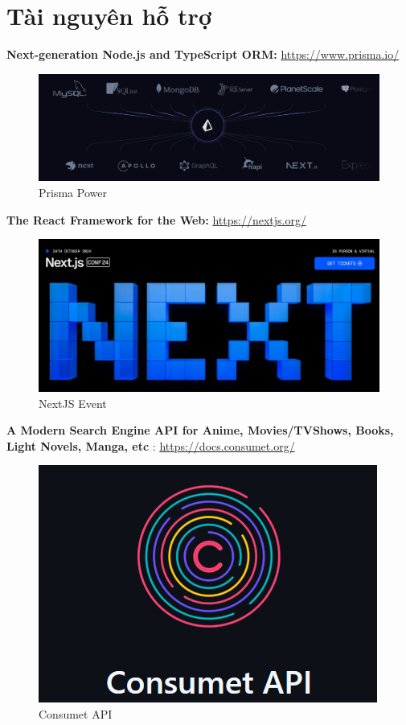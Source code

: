 \section{Tài nguyên hỗ trợ}

\textbf{Next-generation Node.js and TypeScript ORM:} \href{https://www.prisma.io/}{https://www.prisma.io/}

\begin{figure}[H]
    \centering
    \includegraphics[width=0.5\linewidth]{content/resource/image/prisma.png}
    \caption{Prisma Power}
    \label{fig:enter-label}
\end{figure}

\textbf{The React Framework for the Web:} \href{https://nextjs.org/}{https://nextjs.org/}

\begin{figure}[H]
    \centering
    \includegraphics[width=0.5\linewidth]{content/resource/image/next.png}
    \caption{NextJS Event}
    \label{fig:enter-label}
\end{figure}

\textbf{A Modern Search Engine API for Anime, Movies/TVShows, Books, Light Novels, Manga, etc} : \href{https://docs.consumet.org/}{https://docs.consumet.org/}

\begin{figure}[H]
    \centering
    \includegraphics[width=0.5\linewidth]{content/resource/image/api.png}
    \caption{Consumet API}
    \label{fig:enter-label}
\end{figure}

